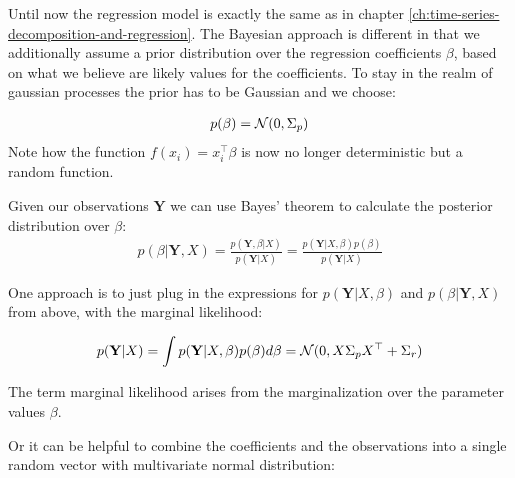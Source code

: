Until now the regression model is exactly the same as in chapter \ref{ch:time-series-decomposition-and-regression}.
The Bayesian approach is different in that we additionally assume a prior distribution over the
regression coefficients $\beta$, based on what we believe are likely values for the coefficients.
To stay in the realm of gaussian processes the prior has to be Gaussian and we choose:

\begin{gather*}
    p(\beta) = \operatorname{\mathcal{N}}(0, \Sigma_p)
\end{gather*}
Note how the function $f(x_i)=x_i^{\top}\beta$ is now no longer deterministic but a random function.

Given our observations $\mathbf{Y}$  we can use Bayes' theorem to calculate the posterior distribution over $\beta$:
\begin{gather*}
    p(\beta| \mathbf{Y}, X) = \frac{p(\mathbf{Y},\beta|X)}{p(\mathbf{Y}|X)} =
    \frac{p(\mathbf{Y}|X,\beta)p(\beta)}{p(\mathbf{Y}|X)}
\end{gather*}

One approach is to just plug in the expressions for
$p(\mathbf{Y}|X,\beta)$ and $p(\beta|\mathbf{Y}, X)$ from above, with the marginal likelihood:

\begin{gather}\label{eq:marginal-likelihood}
    p(\mathbf{Y}|X) = \int p(\mathbf{Y}|X,\beta) p(\beta) d\beta = \operatorname{\mathcal{N}}(0, X \Sigma_p X^{\top} + \Sigma_r)
\end{gather}

The term marginal likelihood arises from the marginalization over the parameter values $\beta$.

Or it can be helpful to combine the coefficients and the observations into a single random vector with
multivariate normal distribution:

